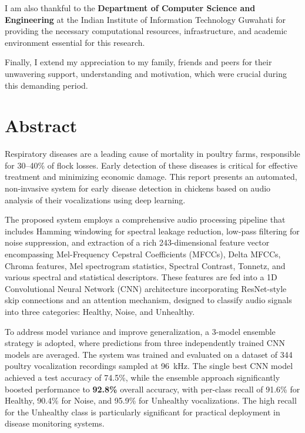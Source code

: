 \documentclass[12pt,a4paper]{report}
\begin{document}
I am also thankful to the \textbf{Department of Computer Science and Engineering} at the Indian Institute of Information Technology Guwahati for providing the necessary computational resources, infrastructure, and academic environment essential for this research.

Finally, I extend my appreciation to my family, friends and peers for their unwavering support, understanding and motivation, which were crucial during this demanding period.

\clearpage

\chapter*{Abstract}
\label{sec:abstract}

\vspace*{1em}

Respiratory diseases are a leading cause of mortality in poultry farms, responsible for 30--40\% of flock losses. Early detection of these diseases is critical for effective treatment and minimizing economic damage. This report presents an automated, non-invasive system for early disease detection in chickens based on audio analysis of their vocalizations using deep learning.

The proposed system employs a comprehensive audio processing pipeline that includes Hamming windowing for spectral leakage reduction, low-pass filtering for noise suppression, and extraction of a rich 243-dimensional feature vector encompassing Mel-Frequency Cepstral Coefficients (MFCCs), Delta MFCCs, Chroma features, Mel spectrogram statistics, Spectral Contrast, Tonnetz, and various spectral and statistical descriptors. These features are fed into a 1D Convolutional Neural Network (CNN) architecture incorporating ResNet-style skip connections and an attention mechanism, designed to classify audio signals into three categories: Healthy, Noise, and Unhealthy.

To address model variance and improve generalization, a 3-model ensemble strategy is adopted, where predictions from three independently trained CNN models are averaged. The system was trained and evaluated on a dataset of 344 poultry vocalization recordings sampled at 96~kHz. The single best CNN model achieved a test accuracy of 74.5\%, while the ensemble approach significantly boosted performance to \textbf{92.8\%} overall accuracy, with per-class recall of 91.6\% for Healthy, 90.4\% for Noise, and 95.9\% for Unhealthy vocalizations. The high recall for the Unhealthy class is particularly significant for practical deployment in disease monitoring systems.
\end{document}
